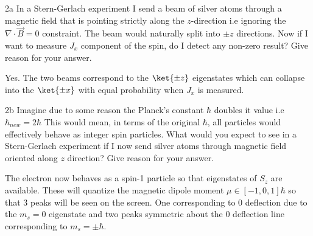 \documentclass[12pt]{article}
\begin{document}
\newpage 
\begin{exc}{2a}
In a Stern-Gerlach experiment I send a beam of silver atoms through a
magnetic field that is pointing strictly along the $z$-direction i.e ignoring
the $\nabla \cdot \vec B = 0$ constraint. The beam would naturally split into $\pm z$
directions. Now if I want to measure $J_x$ component of the spin, do I
detect any non-zero result? Give reason for your answer.
\end{exc}
\begin{ans}
    Yes. The two beams correspond to the $\ket{\pm z}$ eigenstates which can collapse into the $\ket{\pm x}$ with equal probability when $J_x$ is measured.
\end{ans}

\begin{exc}{2b}
Imagine due to some reason the Planck's constant $\hbar$ doubles it value i.e
$\hbar_{new} = 2\hbar$ This would mean, in terms of the original $\hbar$, all particles
would effectively behave as integer spin particles. What would you
expect to see in a Stern-Gerlach experiment if I now send silver atoms
through magnetic field oriented along $z$ direction? Give reason for your
answer.
\end{exc}
\begin{ans}
    The electron now behaves as a spin-1 particle so that eigenstates of $S_z$ are available. These will quantize the magnetic dipole moment $\mu \in [-1, 0, 1]\hbar$ so that 3 peaks will be seen on the screen. One corresponding to 0 deflection due to the $m_s = 0$ eigenstate and two peaks symmetric about the 0 deflection line corresponding to $m_s = \pm \hbar$.
\end{ans}
\end{document}
